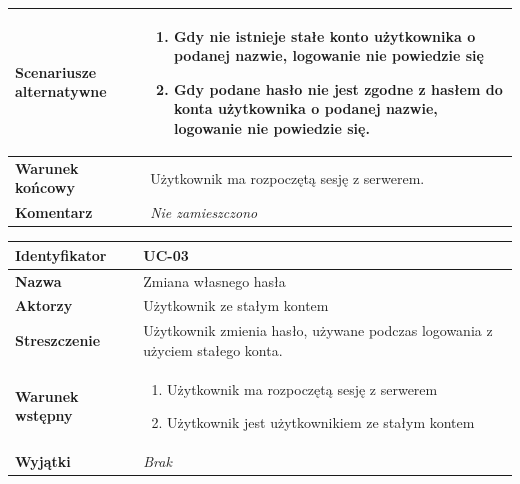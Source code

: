 \documentclass[11pt,oneside,a4paper,titlepage,onecolumn]{article}
\newenvironment{enumreq}
{ \begin{enumerate}[topsep=0pt,itemsep=-1ex,partopsep=1ex,parsep=1ex] }
{ \end{enumerate}                  }
\begin{document}
{\begin{tabular}{ | l | l | }
	\hline
		\parbox[t]{4cm}{\textbf{Scenariusze alternatywne}} & \parbox[t]
		{11cm}{
			\begin{enumerate}
				\item Gdy nie istnieje stałe konto użytkownika o podanej
				nazwie, logowanie nie powiedzie się
				\item Gdy podane hasło nie jest zgodne z hasłem do
				konta użytkownika o podanej nazwie, logowanie nie powiedzie
				się.
			\end{enumerate}
		}
		\\
		
	\hline
		\parbox[t]{4cm}{\textbf{Warunek końcowy}} & \parbox[t]{11cm}{
			Użytkownik ma rozpoczętą sesję z serwerem.
		}
		\\
		
	\hline
		\parbox[t]{4cm}{\textbf{Komentarz}} & \parbox[t]{11cm}{
			\textit{Nie zamieszczono}
		}
		\\

	\hline
\end{tabular}

\vspace{2em}

\begin{tabular}{ | l | l | }
	\hline
		\textbf{Identyfikator} & 
		UC-03
		\\
		
	\hline
		\textbf{Nazwa} & 
		Zmiana własnego hasła
		\\
		
	\hline
		\textbf{Aktorzy} & \parbox[t]{11cm}{
			Użytkownik ze stałym kontem
		}\\
		 
	\hline
		\parbox[t]{4cm}{\textbf{Streszczenie}} & \parbox[t]{11cm}{
			Użytkownik zmienia hasło, używane podczas logowania z użyciem
			stałego konta.
			
		}\\
		
	\hline
		\parbox[t]{4cm}{\textbf{Warunek wstępny}} & \parbox[t]{11cm}{
			\begin{enumreq}
				\item Użytkownik ma rozpoczętą sesję z serwerem
				\item Użytkownik jest użytkownikiem ze stałym kontem
			\end{enumreq}
		}
		\\
		
	\hline
		\parbox[t]{4cm}{\textbf{Wyjątki}} & \parbox[t]{11cm}{
			\textit{Brak}
			
		}
		\\


\end{tabular}}
\end{document}
